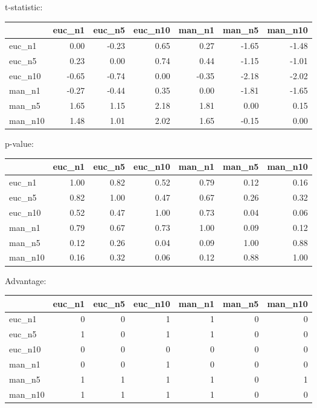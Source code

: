 t-statistic:
 \begin{tabular}{lrrrrrr}
\hline
         &   euc\_n1 &   euc\_n5 &   euc\_n10 &   man\_n1 &   man\_n5 &   man\_n10 \\
\hline
 euc\_n1  &     0.00 &    -0.23 &      0.65 &     0.27 &    -1.65 &     -1.48 \\
 euc\_n5  &     0.23 &     0.00 &      0.74 &     0.44 &    -1.15 &     -1.01 \\
 euc\_n10 &    -0.65 &    -0.74 &      0.00 &    -0.35 &    -2.18 &     -2.02 \\
 man\_n1  &    -0.27 &    -0.44 &      0.35 &     0.00 &    -1.81 &     -1.65 \\
 man\_n5  &     1.65 &     1.15 &      2.18 &     1.81 &     0.00 &      0.15 \\
 man\_n10 &     1.48 &     1.01 &      2.02 &     1.65 &    -0.15 &      0.00 \\
\hline
\end{tabular} 

p-value:
 \begin{tabular}{lrrrrrr}
\hline
         &   euc\_n1 &   euc\_n5 &   euc\_n10 &   man\_n1 &   man\_n5 &   man\_n10 \\
\hline
 euc\_n1  &     1.00 &     0.82 &      0.52 &     0.79 &     0.12 &      0.16 \\
 euc\_n5  &     0.82 &     1.00 &      0.47 &     0.67 &     0.26 &      0.32 \\
 euc\_n10 &     0.52 &     0.47 &      1.00 &     0.73 &     0.04 &      0.06 \\
 man\_n1  &     0.79 &     0.67 &      0.73 &     1.00 &     0.09 &      0.12 \\
 man\_n5  &     0.12 &     0.26 &      0.04 &     0.09 &     1.00 &      0.88 \\
 man\_n10 &     0.16 &     0.32 &      0.06 &     0.12 &     0.88 &      1.00 \\
\hline
\end{tabular} 

Advantage:
 \begin{tabular}{lrrrrrr}
\hline
         &   euc\_n1 &   euc\_n5 &   euc\_n10 &   man\_n1 &   man\_n5 &   man\_n10 \\
\hline
 euc\_n1  &        0 &        0 &         1 &        1 &        0 &         0 \\
 euc\_n5  &        1 &        0 &         1 &        1 &        0 &         0 \\
 euc\_n10 &        0 &        0 &         0 &        0 &        0 &         0 \\
 man\_n1  &        0 &        0 &         1 &        0 &        0 &         0 \\
 man\_n5  &        1 &        1 &         1 &        1 &        0 &         1 \\
 man\_n10 &        1 &        1 &         1 &        1 &        0 &         0 \\
\hline
\end{tabular} 

